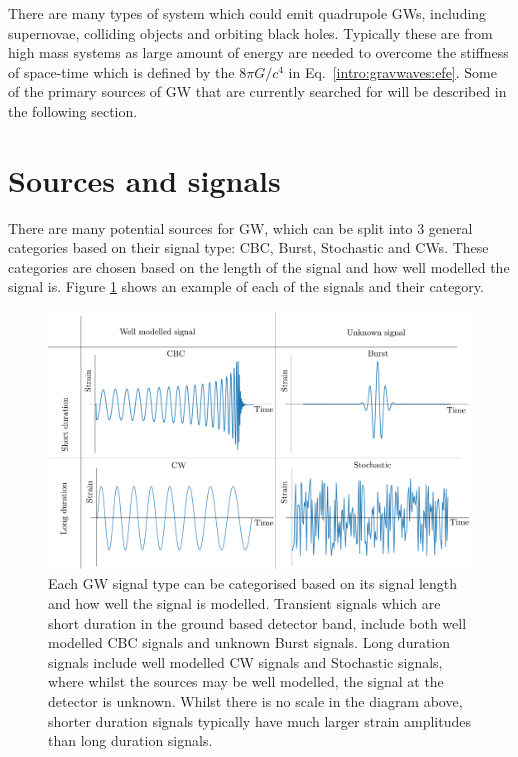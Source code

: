 There are many types of system which could emit quadrupole \glspl{GW}, including supernovae, colliding objects and orbiting black holes. 
Typically these are from high mass systems as large amount of energy are needed to overcome the stiffness of space-time which is defined by the $8 \pi G/c^4$ in Eq.~\ref{intro:gravwaves:efe}.
Some of the primary sources of \gls{GW} that are currently searched for will be described in the following section.




\section{\label{intro:sources}Sources and signals}

There are many potential sources for \gls{GW}, which can be split into 3
general categories based on their signal type: \gls{CBC}, Burst, Stochastic and
\glspl{CW}.  These categories are chosen based on the length of the signal and
how well modelled the signal is.  Figure \ref{intro:sources:signaltypes} shows
an example of each of the signals and their category.
%
\begin{figure}[h]
    \centering
    \includegraphics[width=\textwidth]{C1_intro/sources_types.pdf}
    \caption[GW signal types]{Each \gls{GW} signal type can be categorised
based on its signal length and how well the signal is modelled. Transient
signals which are short duration in the ground based detector band, include
both well modelled \gls{CBC} signals and unknown Burst signals. Long duration
signals include well modelled \gls{CW} signals and Stochastic
signals, where whilst the sources may be well modelled, the signal at the detector is unknown.
Whilst there is no scale in the diagram above, shorter duration signals typically have much larger strain amplitudes than long duration signals.}
\label{intro:sources:signaltypes}
\end{figure}

